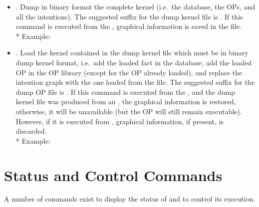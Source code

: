 \begin{itemize}

\item {}.  Dump in binary format the complete
kernel (i.e.\ the database, the OPs, and all the intentions). The suggested
suffix for the dump kernel file is . If this command is executed 
from the \XPK{}, graphical information is saved in the file.\\*
Example: 

\item {}.  Load the kernel contained
in the dump kernel file which must be in binary dump kernel format, i.e.\ add
the loaded fact in the database, add the loaded OP in the OP library (except
for the OP already loaded), and replace the intention graph with the one loaded
from the file. The suggested suffix for the dump OP file is .  If
this command is executed from the \XPK{}, and the dump kernel file was produced
from an \XPK{}, the graphical information is restored, otherwise, it will be
unavailable (but the OP will still remain executable).  However, if it is
executed from \aCPK{}, graphical information, if present, is discarded. \\*
Example: 

\end{itemize}

\section{\CPK{} Status and Control Commands}

A number of commands exist to display the status of \CPK{} and to control
its execution.

